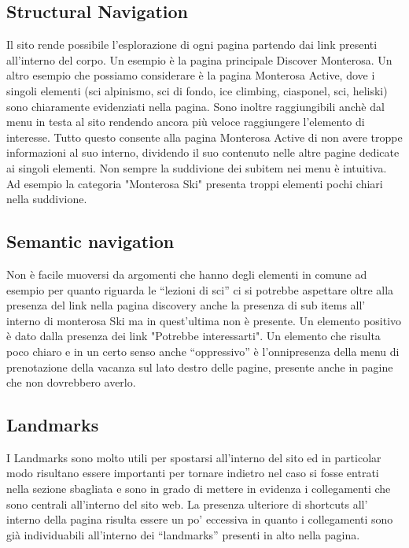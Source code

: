         \subsection{Structural Navigation}
        Il sito rende possibile l'esplorazione di ogni pagina partendo dai link
        presenti all’interno del corpo. Un esempio è  la pagina principale
        Discover Monterosa.
        Un altro esempio che possiamo considerare è la pagina Monterosa Active,
        dove i singoli elementi  (sci alpinismo, sci di fondo, ice climbing,
        ciasponel, sci, heliski) sono chiaramente evidenziati nella pagina. Sono
        inoltre raggiungibili anchè dal menu in testa al sito rendendo ancora
        più veloce raggiungere l’elemento di interesse. Tutto questo consente
        alla pagina Monterosa Active di non avere troppe informazioni al suo
        interno, dividendo il suo contenuto nelle altre pagine dedicate ai
        singoli elementi.
        Non sempre la suddivione dei subitem nei menu è intuitiva. Ad esempio la
        categoria "Monterosa Ski" presenta troppi elementi pochi chiari nella
        suddivione.
        \subsection{Semantic navigation}
        Non è facile muoversi da argomenti che hanno degli elementi in comune ad
        esempio per quanto riguarda le “lezioni di sci” ci si potrebbe aspettare
        oltre alla presenza del link nella pagina discovery anche la presenza di
        sub items all’ interno di monterosa Ski ma in quest'ultima non è
        presente. Un elemento positivo è dato dalla presenza dei link "Potrebbe
        interessarti".
        Un elemento che risulta poco chiaro e in un certo senso anche
        “oppressivo” è l’onnipresenza della menu di prenotazione della vacanza
        sul lato destro delle pagine, presente anche in pagine che non
        dovrebbero averlo.
        \subsection{Landmarks}
        I Landmarks sono molto utili per spostarsi all'interno del sito ed in
        particolar modo risultano essere importanti per tornare indietro nel
        caso si fosse entrati nella sezione sbagliata e sono in grado di mettere
        in evidenza i collegamenti che sono centrali all'interno del sito web.
        La presenza ulteriore di shortcuts all’ interno della pagina risulta
        essere un po’ eccessiva in quanto i collegamenti sono già individuabili
        all'interno dei “landmarks” presenti in alto nella pagina.
  
